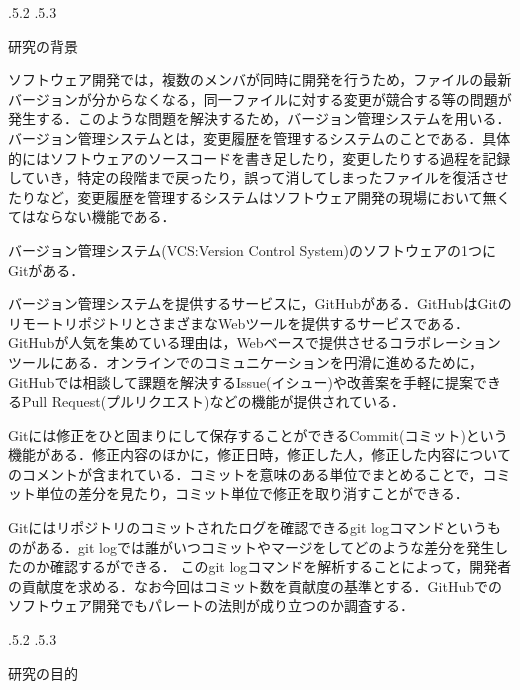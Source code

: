 \documentclass[uplatex]{jsarticle}
\title{\vspace{-14mm}{オープンソースソフトウェア開発における開発者あたりのコミット数のパレート分析}}
\author{PMコース　矢吹研究室　1342100　春川 直幸}
\date{}%
\makeatletter
\renewcommand{\section}{%
    \if@slide\clearpage\fi
    \@startsection{section}{1}{\z@}%
    {\Cvs \@plus.5\Cdp \@minus.2\Cdp}%
    {.5\Cvs \@plus.3\Cdp}%
    {\normalfont\raggedright}}
\makeatother
\begin{document}
\maketitle





\section{研究の背景}

ソフトウェア開発では，複数のメンバが同時に開発を行うため，ファイルの最新バージョンが分からなくなる，同一ファイルに対する変更が競合する等の問題が発生する．このような問題を解決するため，バージョン管理システムを用いる\cite{ikeda2014}．バージョン管理システムとは，変更履歴を管理するシステムのことである．具体的にはソフトウェアのソースコードを書き足したり，変更したりする過程を記録していき，特定の段階まで戻ったり，誤って消してしまったファイルを復活させたりなど，変更履歴を管理するシステムはソフトウェア開発の現場において無くてはならない機能である\cite{otuka2014}．

バージョン管理システム(VCS:Version Control System)のソフトウェアの1つにGitがある\cite{shioya2014}．

バージョン管理システムを提供するサービスに，GitHubがある．GitHubはGitのリモートリポジトリとさまざまなWebツールを提供するサービスである．GitHubが人気を集めている理由は，Webベースで提供させるコラボレーションツールにある．オンラインでのコミュニケーションを円滑に進めるために，GitHubでは相談して課題を解決するIssue(イシュー)や改善案を手軽に提案できるPull Request(プルリクエスト)などの機能が提供されている\cite{shioya2014}．

Gitには修正をひと固まりにして保存することができるCommit(コミット)という機能がある．修正内容のほかに，修正日時，修正した人，修正した内容についてのコメントが含まれている．コミットを意味のある単位でまとめることで，コミット単位の差分を見たり，コミット単位で修正を取り消すことができる\cite{shioya2014}．

Gitにはリポジトリのコミットされたログを確認できるgit logコマンドというものがある．git logでは誰がいつコミットやマージをしてどのような差分を発生したのか確認するができる\cite{otuka2014}．
このgit logコマンドを解析することによって，開発者の貢献度を求める．なお今回はコミット数を貢献度の基準とする．GitHubでのソフトウェア開発でもパレートの法則が成り立つのか調査する．

\section{研究の目的}
\end{document}
